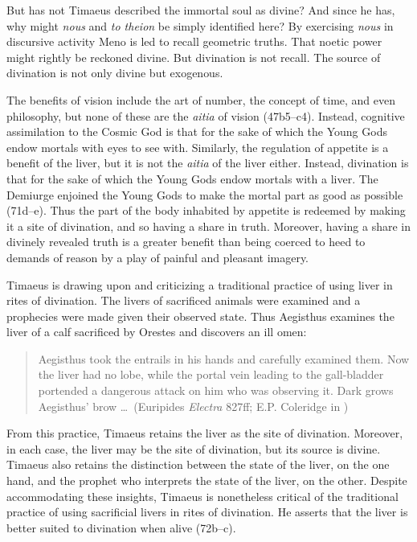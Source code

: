 But has not Timaeus described the immortal soul as divine? And since he has, why might \emph{nous} and \emph{to theion} be simply identified here? By exercising \emph{nous} in discursive activity Meno is led to recall geometric truths. That noetic power might rightly be reckoned divine. But divination is not recall. The source of divination is not only divine but exogenous.

The benefits of vision include the art of number, the concept of time, and even philosophy, but none of these are the \emph{aitia} of vision (47b5--c4). Instead, cognitive assimilation to the Cosmic God is that for the sake of which the Young Gods endow mortals with eyes to see with. Similarly, the regulation of appetite is a benefit of the liver, but it is not the \emph{aitia} of the liver either. Instead, divination is that for the sake of which the Young Gods endow mortals with a liver. The Demiurge enjoined the Young Gods to make the mortal part as good as possible (71d--e). Thus the part of the body inhabited by appetite is redeemed by making it a site of divination, and so having a share in truth. Moreover, having a share in divinely revealed truth is a greater benefit than being coerced to heed to demands of reason by a play of painful and pleasant imagery.

Timaeus is drawing upon and criticizing a traditional practice of using liver in rites of divination. The livers of sacrificed animals were examined and a prophecies were made given their observed state. Thus Aegisthus examines the liver of a calf sacrificed by Orestes and discovers an ill omen:
\begin{quote}
	Aegisthus took the entrails in his hands and carefully examined them. Now the liver had no lobe, while the portal vein leading to the gall-bladder portended a dangerous attack on him who was observing it. Dark grows Aegis\-thus' brow \ldots\ (Euripides \emph{Electra} 827ff; E.P. Coleridge in \citealt[92]{Oates:1938la})
\end{quote}
From this practice, Timaeus retains the liver as the site of divination. Moreover, in each case, the liver may be the site of divination, but its source is divine. Timaeus also retains the distinction between the state of the liver, on the one hand, and the prophet who interprets the state of the liver, on the other. Despite accommodating these insights, Timaeus is nonetheless critical of the traditional practice of using sacrificial livers in rites of divination. He asserts that the liver is better suited to divination when alive (72b--c).


